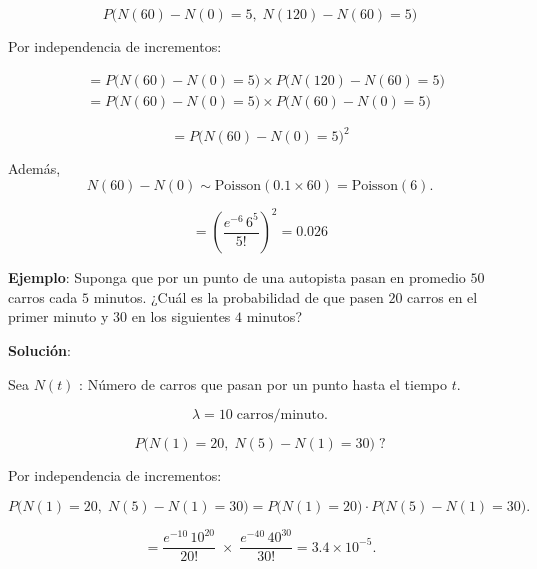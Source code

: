 \documentclass[12pt,a4paper]{article}
\begin{document}
\begin{equation*}
P\big(N(60) - N(0) = 5,\; N(120) - N(60) = 5\big)
\end{equation*}

Por independencia de incrementos:

\begin{align*}
&= P\big(N(60) - N(0) = 5\big) \times P\big(N(120) - N(60) = 5\big) \\
&= P\big(N(60) - N(0) = 5\big) \times P\big(N(60) - N(0) = 5\big)
\end{align*}

\begin{equation*}
= P\big(N(60) - N(0) = 5\big)^2
\end{equation*}

Además,
\begin{equation*}
N(60) - N(0) \sim \text{Poisson}(0.1 \times 60) = \text{Poisson}(6).
\end{equation*}

\begin{equation*}
= \left( \frac{e^{-6} \, 6^5}{5!} \right)^2 = 0.026
\end{equation*}

\textbf{Ejemplo}: Suponga que por un punto de una autopista pasan en promedio $50$ carros cada $5$ minutos. ¿Cuál es la probabilidad de que pasen $20$ carros en el primer minuto y $30$ en los siguientes $4$ minutos?

\textbf{Solución}:

Sea $N(t)$ : Número de carros que pasan por un punto hasta el tiempo $t$.

\begin{equation*}
\lambda = 10 \; \text{carros/minuto}.
\end{equation*}

\begin{equation*}
P\big(N(1)=20,\; N(5)-N(1)=30\big)\; ?
\end{equation*}

Por independencia de incrementos:

\begin{equation*}
P\big(N(1)=20,\; N(5)-N(1)=30\big)
= P\big(N(1)=20\big)\cdot P\big(N(5)-N(1)=30\big).
\end{equation*}

\begin{equation*}
= \frac{e^{-10}\,10^{20}}{20!} \; \times \; \frac{e^{-40}\,40^{30}}{30!}
= 3.4 \times 10^{-5}.
\end{equation*}
\end{document}
